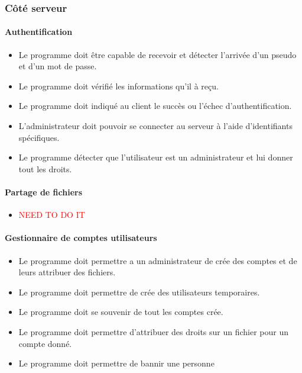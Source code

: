 \documentclass[10pt,a4paper]{report}
\begin{document}
\subsubsection{Côté serveur}
\paragraph{Authentification}
	\begin{itemize}[label = $\triangleright$]
		\item Le programme doit être capable de recevoir et détecter l'arrivée d'un pseudo et d'un mot de passe.
		\item Le programme doit vérifié les informations qu'il à reçu.
		\item Le programme doit indiqué au client le succès ou l'échec d'authentification.
		\item L'administrateur doit pouvoir se connecter au serveur à l'aide d'identifiants spécifiques.
		\item Le programme détecter que l'utilisateur est un administrateur et lui donner tout les droits.	
	\end{itemize}
	
\paragraph{Partage de fichiers}
	\begin{itemize}[label = $\triangleright$]
		\item \textcolor{red}{NEED TO DO IT}
	\end{itemize}
	
\paragraph{Gestionnaire de comptes utilisateurs}
	\begin{itemize}[label = $\triangleright$]
		\item Le programme doit permettre a un administrateur de crée des comptes et de leurs attribuer des fichiers.
		\item Le programme doit permettre de crée des utilisateurs temporaires.
		\item Le programme doit se souvenir de tout les comptes crée.
		\item Le programme doit permettre d'attribuer des droits sur un fichier pour un compte donné.
		\item Le programme doit permettre de bannir une personne
	\end{itemize}
\end{document}
